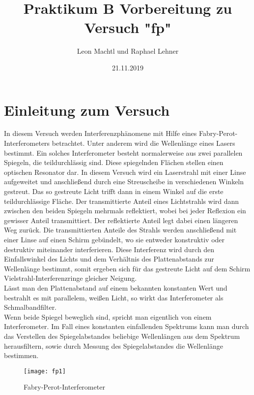 \documentclass[a4paper,10pt]{scrartcl}
\title{Praktikum B Vorbereitung zu Versuch "fp"}
\author{Leon Machtl und Raphael Lehner}
\date{21.11.2019}
\begin{document}
	\maketitle
	\tableofcontents
	\newpage
	
	\section{Einleitung zum Versuch}
	In diesem Versuch werden Interferenzphänomene mit Hilfe eines Fabry-Perot-Interferometers betrachtet. Unter anderem wird die Wellenlänge eines Lasers bestimmt. Ein solches Interferometer besteht normalerweise aus zwei parallelen Spiegeln, die teildurchlässig sind. Diese spiegelnden Flächen stellen einen optischen Resonator dar. In diesem Versuch wird ein Laserstrahl mit einer Linse aufgeweitet und anschließend durch eine Streuscheibe in verschiedenen Winkeln gestreut. Das so gestreute Licht trifft dann in einem Winkel auf die erste teildurchlässige Fläche. Der transmittierte Anteil eines Lichtstrahls wird dann zwischen den beiden Spiegeln mehrmals reflektiert, wobei bei jeder Reflexion ein gewisser Anteil transmittiert. Der reflektierte Anteil legt dabei einen längeren Weg zurück. Die transmittierten Anteile des Strahls werden anschließend mit einer Linse auf einen Schirm gebündelt, wo sie entweder konstruktiv oder destruktiv miteinander interferieren. Diese Interferenz wird durch den Einfallswinkel des Lichts und dem Verhältnis des Plattenabstands zur Wellenlänge bestimmt, somit ergeben sich für das gestreute Licht auf dem Schirm Vielstrahl-Interferenzringe gleicher Neigung. \\
	Lässt man den Plattenabstand auf einem bekannten konstanten Wert und bestrahlt es mit parallelem, weißen Licht, so wirkt das Interferometer als Schmalbandfilter.\\
	Wenn beide Spiegel beweglich sind, spricht man eigentlich von einem Interferometer. Im Fall eines konstanten einfallenden Spektrums kann man durch das Verstellen des Spiegelabstandes beliebige Wellenlängen aus dem Spektrum herausfiltern, sowie durch Messung des Spiegelabstandes die Wellenlänge bestimmen.
	\begin{figure}[h]
\centering
\texttt{[image: fp1]}
\caption{Fabry-Perot-Interferometer}
\end{figure}
\FloatBarrier
	
\end{document}
